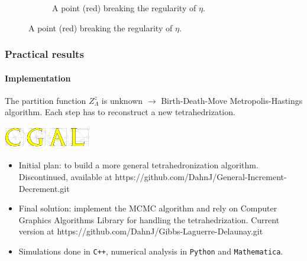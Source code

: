 \documentclass[c, 10pt]{beamer}
\begin{document}
\begin{frame}
\begin{figure}
\begin{minipage}{0.45\textwidth}
\begin{figure}[p]
{
}
\caption{\scriptsize A point (red) breaking the regularity of $\eta$.}
\label{fig:Laguerrecospherical}
\end{figure}
    \end{minipage}
\end{figure}

\vspace{-4mm}

\end{frame}





\begin{frame}\frametitle{Practical results}
	\framesubtitle{Implementation}

	The partition function $Z^z_\Lambda$ is unknown $\rightarrow$ Birth-Death-Move Metropolis-Hastings algorithm. \newline
	Each step has to reconstruct a new tetrahedrization.
	
\begin{center}
\includegraphics[height = 1cm]{./FigureLayout/cgal.png}
\end{center}


\begin{itemize}
	\item Initial plan: to build a more general tetrahedronization algorithm. \newline
		{\scriptsize Discontinued, available at \alert{https://github.com/DahnJ/General-Increment-Decrement.git}}
	\item Final solution: implement the MCMC algorithm and rely on Computer Graphics Algorithms Library for handling the tetrahedrization. \newline
		{\footnotesize Current version at \alert{https://github.com/DahnJ/Gibbs-Laguerre-Delaunay.git}}
	\item Simulations done in \texttt{C++}, numerical analysis in \texttt{Python} and \texttt{Mathematica}.
\end{itemize}

\end{frame}
\end{document}
